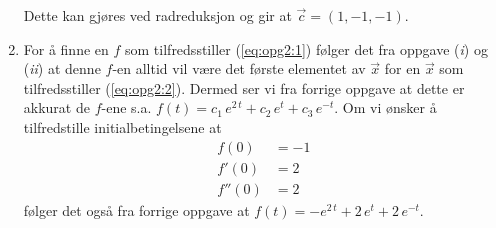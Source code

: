 \documentclass{article}[norsk]
\begin{document}
\begin{enumerate}[label=(\textit{\roman*})]
\begin{equation*}
    \end{equation*}
    Dette kan gjøres ved radreduksjon og gir at $\displaystyle\vec{c}=\left(1,-1,-1\right)$. 
    \item %
    For å finne en $f$ som tilfredsstiller (\ref{eq:opg2:1}) følger det fra oppgave (\textit{i}) og (\textit{ii}) at denne $f$-en alltid vil være det første elementet av $\vec{x}$ for en $\vec{x}$ som tilfredsstiller (\ref{eq:opg2:2}). Dermed ser vi fra forrige oppgave at dette er akkurat de $f$-ene s.a. $f(t)=c_1\,e^{2\,t}+c_2\,e^t+c_3\,e^{-t}$. Om vi ønsker å tilfredstille initialbetingelsene at
    \begin{equation*}\begin{aligned}
    	f(0)&=-1\\
        f'(0)&=2\\
        f''(0)&=2
    \end{aligned} \end{equation*}
    følger det også fra forrige oppgave at $f(t)=-e^{2\,t}+2\,e^t+2\,e^{-t}$.
\end{enumerate}
\end{document}
